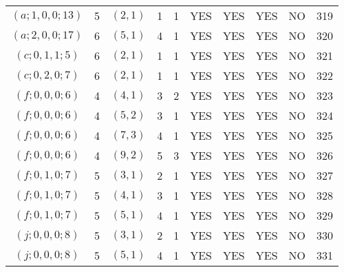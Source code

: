 \begin{longtable}{|c|c|c|c|c|c|c|c|c|c|}
$(a; 1, 0, 0; 13)$ & 5 & $(2, 1)$ & 1 & 1 & YES & YES & YES & NO & 319\\
$(a; 2, 0, 0; 17)$ & 6 & $(5, 1)$ & 4 & 1 & YES & YES & YES & NO & 320\\
$(c; 0, 1, 1; 5)$ & 6 & $(2, 1)$ & 1 & 1 & YES & YES & YES & NO & 321\\
$(c; 0, 2, 0; 7)$ & 6 & $(2, 1)$ & 1 & 1 & YES & YES & YES & NO & 322\\
$(f; 0, 0, 0; 6)$ & 4 & $(4, 1)$ & 3 & 2 & YES & YES & YES & NO & 323\\
$(f; 0, 0, 0; 6)$ & 4 & $(5, 2)$ & 3 & 1 & YES & YES & YES & NO & 324\\
$(f; 0, 0, 0; 6)$ & 4 & $(7, 3)$ & 4 & 1 & YES & YES & YES & NO & 325\\
$(f; 0, 0, 0; 6)$ & 4 & $(9, 2)$ & 5 & 3 & YES & YES & YES & NO & 326\\
$(f; 0, 1, 0; 7)$ & 5 & $(3, 1)$ & 2 & 1 & YES & YES & YES & NO & 327\\
$(f; 0, 1, 0; 7)$ & 5 & $(4, 1)$ & 3 & 1 & YES & YES & YES & NO & 328\\
$(f; 0, 1, 0; 7)$ & 5 & $(5, 1)$ & 4 & 1 & YES & YES & YES & NO & 329\\
$(j; 0, 0, 0; 8)$ & 5 & $(3, 1)$ & 2 & 1 & YES & YES & YES & NO & 330\\
$(j; 0, 0, 0; 8)$ & 5 & $(5, 1)$ & 4 & 1 & YES & YES & YES & NO & 331
\end{longtable}
